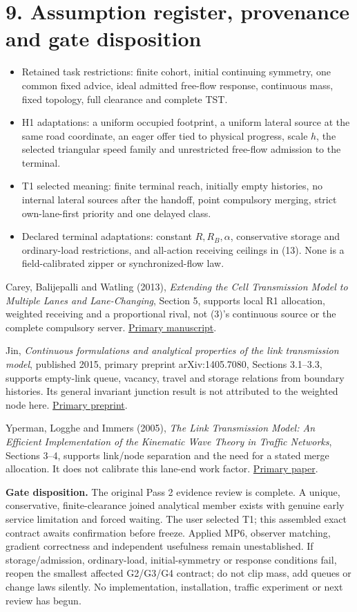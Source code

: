 \documentclass[11pt,a4paper]{article}
\begin{document}
\section*{9. Assumption register, provenance and gate disposition}
\begin{itemize}
\item Retained task restrictions: finite cohort, initial continuing symmetry,
one common fixed advice, ideal admitted free-flow response, continuous mass,
fixed topology, full clearance and complete TST.
\item H1 adaptations: a uniform occupied footprint, a uniform lateral source
at the same road coordinate, an eager offer tied to physical progress,
scale $h$, the selected triangular speed family and unrestricted free-flow
admission to the terminal.
\item T1 selected meaning: finite terminal reach, initially empty histories,
no internal lateral sources after the handoff, point compulsory merging,
strict own-lane-first priority and one delayed class.
\item Declared terminal adaptations: constant $R,R_B,\alpha$, conservative
storage and ordinary-load restrictions, and all-action receiving ceilings
in (13). None is a field-calibrated zipper or synchronized-flow law.
\end{itemize}

Carey, Balijepalli and Watling (2013), \emph{Extending the Cell Transmission
Model to Multiple Lanes and Lane-Changing}, Section 5, supports local R1 allocation,
weighted receiving and a proportional rival, not (3)'s continuous source or
the complete compulsory server.
\href{https://eprints.whiterose.ac.uk/id/eprint/77315/7/Carey\%20et\%20al\%202013_with_coversheet.pdf}{Primary manuscript}.

Jin, \emph{Continuous formulations and analytical properties of the link
transmission model}, published 2015, primary preprint arXiv:1405.7080,
Sections 3.1--3.3, supports empty-link queue, vacancy, travel and storage
relations from boundary histories.
Its general invariant junction result is not attributed to the weighted
node here. \href{https://arxiv.org/pdf/1405.7080}{Primary preprint}.

Yperman, Logghe and Immers (2005), \emph{The Link Transmission Model: An
Efficient Implementation of the Kinematic Wave Theory in Traffic Networks},
Sections 3--4, supports link/node separation and the need for a stated merge
allocation. It does not calibrate this lane-end work factor.
\href{https://www.mech.kuleuven.be/cib/verkeer/dwn/pub/P2005C.pdf}{Primary paper}.

\textbf{Gate disposition.} The original Pass 2 evidence review is complete.
A unique, conservative, finite-clearance joined analytical member exists
with genuine early service limitation and forced waiting. The user selected
T1; this assembled exact contract awaits confirmation before freeze.
Applied MP6, observer matching, gradient correctness and independent
usefulness remain unestablished. If storage/admission, ordinary-load,
initial-symmetry or response conditions fail, reopen the smallest affected
G2/G3/G4 contract; do not clip mass, add queues or change laws silently.
No implementation, installation, traffic experiment or next review has begun.
\end{document}
